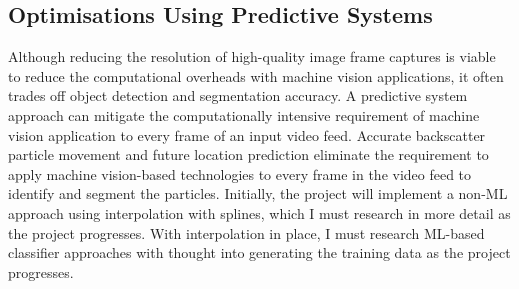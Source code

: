 \subsection{Optimisations Using Predictive Systems}
Although reducing the resolution of high-quality image frame captures is viable to reduce the computational overheads with machine vision applications, it often trades off object detection and segmentation accuracy. A predictive system approach can mitigate the computationally intensive requirement of machine vision application to every frame of an input video feed. Accurate backscatter particle movement and future location prediction eliminate the requirement to apply machine vision-based technologies to every frame in the video feed to identify and segment the particles. Initially, the project will implement a non-ML approach using interpolation with splines, which I must research in more detail as the project progresses. With interpolation in place, I must research ML-based classifier approaches with thought into generating the training data as the project progresses.
